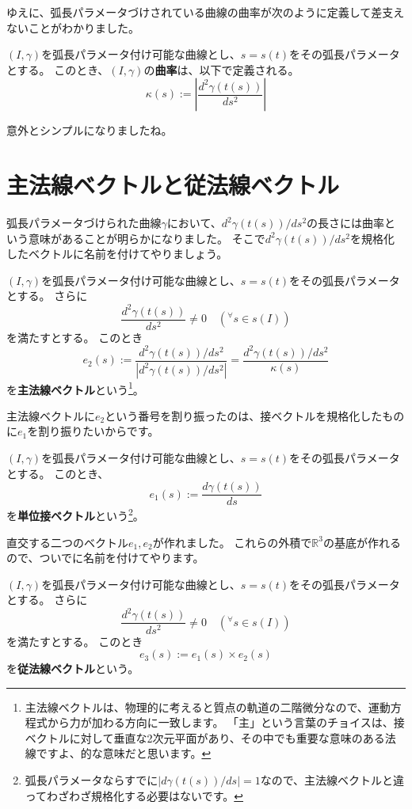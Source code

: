 ゆえに、弧長パラメータづけされている曲線の曲率が次のように定義して差支えないことがわかりました。
\begin{definition}
  $(I,\gamma)$を弧長パラメータ付け可能な曲線とし、$s=s(t)$をその弧長パラメータとする。
  このとき、$(I,\gamma)$の\textbf{曲率}は、以下で定義される。
  \[
    \kappa(s):=\left|\frac{d^2\gamma(t(s))}{ds^2}\right|
  \]
\end{definition}
\noindent
意外とシンプルになりましたね。



\section{主法線ベクトルと従法線ベクトル}

弧長パラメータづけられた曲線$\gamma$において、$d^2\gamma(t(s))/ds^2$の長さには曲率という意味があることが明らかになりました。
そこで$d^2\gamma(t(s))/ds^2$を規格化したベクトルに名前を付けてやりましょう。
\begin{definition}
  $(I,\gamma)$を弧長パラメータ付け可能な曲線とし、$s=s(t)$をその弧長パラメータとする。
  さらに
  \[
    \frac{d^2\gamma(t(s))}{ds^2}\neq0\quad({}^\forall s\in s(I))
  \]
  を満たすとする。
  このとき
  \[
    e_2(s):=\frac{d^2\gamma(t(s))/ds^2}{|d^2\gamma(t(s))/ds^2|}=\frac{d^2\gamma(t(s))/ds^2}{\kappa(s)}
  \]
  を\textbf{主法線ベクトル}という\footnote{
    主法線ベクトルは、物理的に考えると質点の軌道の二階微分なので、運動方程式から力が加わる方向に一致します。
    「主」という言葉のチョイスは、接ベクトルに対して垂直な2次元平面があり、その中でも重要な意味のある法線ですよ、的な意味だと思います。
  }。
\end{definition}

主法線ベクトルに$e_2$という番号を割り振ったのは、接ベクトルを規格化したものに$e_1$を割り振りたいからです。
\begin{definition}
  $(I,\gamma)$を弧長パラメータ付け可能な曲線とし、$s=s(t)$をその弧長パラメータとする。
  このとき、
  \[
    e_1(s):=\frac{d\gamma(t(s))}{ds}
  \]
  を\textbf{単位接ベクトル}という\footnote{
    弧長パラメータならすでに$|d\gamma(t(s))/ds|=1$なので、主法線ベクトルと違ってわざわざ規格化する必要はないです。
  }。
\end{definition}

直交する二つのベクトル$e_1,e_2$が作れました。
これらの外積で$\mathbb{R}^3$の基底が作れるので、ついでに名前を付けてやります。
\begin{definition}
  $(I,\gamma)$を弧長パラメータ付け可能な曲線とし、$s=s(t)$をその弧長パラメータとする。
  さらに
  \[
    \frac{d^2\gamma(t(s))}{ds^2}\neq0\quad({}^\forall s\in s(I))
  \]
  を満たすとする。
  このとき
  \[
    e_3(s):=e_1(s)\times e_2(s)
  \]
  を\textbf{従法線ベクトル}という。
\end{definition}



